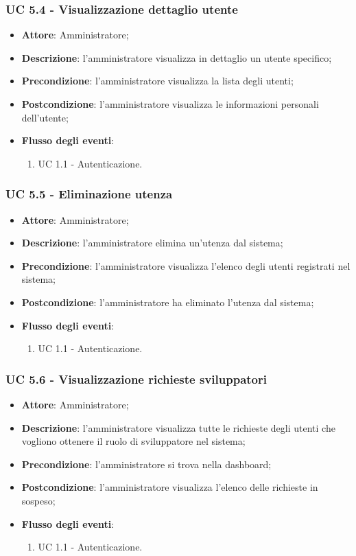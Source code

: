 \subsubsection{UC 5.4 - Visualizzazione dettaglio utente}
\begin{itemize}
\item \textbf{Attore}: Amministratore;
\item \textbf{Descrizione}: l'amministratore visualizza in dettaglio un utente specifico;
\item \textbf{Precondizione}: l'amministratore visualizza la lista degli utenti;
\item \textbf{Postcondizione}: l'amministratore visualizza le informazioni personali dell'utente;
\item \textbf{Flusso degli eventi}:
\begin{enumerate}
	\item UC 1.1 - Autenticazione.
\end{enumerate}
\end{itemize}


\subsubsection{UC 5.5 - Eliminazione utenza}
\begin{itemize}
\item \textbf{Attore}: Amministratore;
\item \textbf{Descrizione}: l'amministratore elimina un'utenza dal sistema;
\item \textbf{Precondizione}: l'amministratore visualizza l'elenco degli utenti registrati nel sistema;
\item \textbf{Postcondizione}: l'amministratore ha eliminato l'utenza dal sistema;
\item \textbf{Flusso degli eventi}: 
\begin{enumerate}
	\item UC 1.1 - Autenticazione.
\end{enumerate}
\end{itemize}


\subsubsection{UC 5.6 - Visualizzazione richieste sviluppatori}
\begin{itemize}
\item \textbf{Attore}: Amministratore;
\item \textbf{Descrizione}: l'amministratore visualizza tutte le richieste degli utenti che vogliono ottenere il ruolo di sviluppatore nel sistema;
\item \textbf{Precondizione}: l'amministratore si trova nella dashboard;
\item \textbf{Postcondizione}: l'amministratore visualizza l'elenco delle richieste in sospeso;
\item \textbf{Flusso degli eventi}: 
\begin{enumerate}
	\item UC 1.1 - Autenticazione.
\end{enumerate}
\end{itemize}


